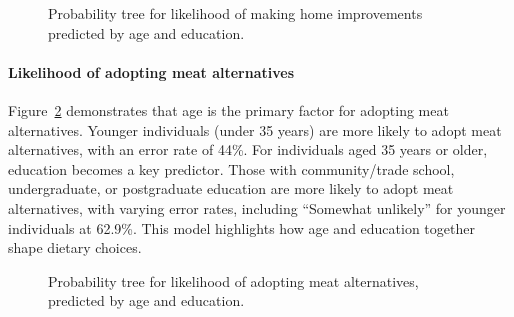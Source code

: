 \documentclass[
  letterpaper,
  DIV=11,
  numbers=noendperiod]{scrartcl}
\let\oldparagraph\paragraph
\renewcommand{\paragraph}[1]{\oldparagraph{#1}\mbox{}}
\begin{document}
\begin{figure}


\caption{\label{fig-sixteen}Probability tree for likelihood of making
home improvements predicted by age and education.}

\end{figure}%

\paragraph{Likelihood of adopting meat
alternatives}\label{likelihood-of-adopting-meat-alternatives}

Figure~\ref{fig-seventeen} demonstrates that age is the primary factor
for adopting meat alternatives. Younger individuals (under 35 years) are
more likely to adopt meat alternatives, with an error rate of 44\%. For
individuals aged 35 years or older, education becomes a key predictor.
Those with community/trade school, undergraduate, or postgraduate
education are more likely to adopt meat alternatives, with varying error
rates, including ``Somewhat unlikely'' for younger individuals at
62.9\%. This model highlights how age and education together shape
dietary choices.

\begin{figure}


\caption{\label{fig-seventeen}Probability tree for likelihood of
adopting meat alternatives, predicted by age and education.}

\end{figure}%
\end{document}
